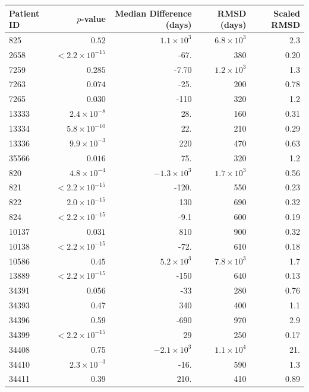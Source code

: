 \documentclass[12pt]{article}
\newcommand{\badpat}[1]{\rowcolor{badpatcol}#1}
\begin{document}
\begin{table}[!ht]
\def\arraystretch{1.3}%
\begin{center}
\begin{tabular}{lrrrr} 
Patient ID & $p$-value & Median Difference (days) & RMSD (days) & Scaled RMSD \\ 
\hline
\badpat{825 & $0.52$ & $1.1 \times 10^3$ & $6.8 \times 10^3$ & 2.3} \\
2658 & $< 2.2 \times 10^{-15}$  & -67. & 380 & 0.20 \\
\badpat{7259 & $0.285$ & -7.70 & $1.2 \times 10^{3}$ & 1.3} \\
\badpat{7263 & $0.074$ & -25. & 200 & 0.78} \\
\badpat{7265 & $0.030$ & -110 & 320 & 1.2} \\
13333 & $2.4 \times 10^{-8}$ & 28. & 160 & 0.31 \\
13334 & $5.8 \times 10^{-10}$ & 22. & 210 & 0.29 \\
13336 & $9.9 \times 10^{-3}$ & 220 & 470 & 0.63 \\
\badpat{35566 & $0.016$ & 75. & 320 & 1.2} \\
\hline
820 & $4.8 \times 10^{-4}$ & $-1.3 \times 10^{3}$ & $1.7 \times 10^{3}$ & 0.56 \\
821 & $< 2.2 \times 10^{-15}$ & -120. & 550 & 0.23 \\
822 & $2.0 \times 10^{-15}$ & 130 & 690 & 0.32 \\
824 & $< 2.2 \times 10^{-15}$ & -9.1 & 600 & 0.19 \\
\badpat{10137 & $0.031$ & 810 & 900 & 0.32} \\
10138 & $< 2.2 \times 10^{-15}$ & -72. & 610 & 0.18 \\
\badpat{10586 & $0.45$ & $5.2 \times 10^3$ & $7.8 \times 10^{3}$ & 1.7} \\
13889 & $< 2.2 \times 10^{-15}$ & -150 & 640 & 0.13 \\
\badpat{34391 & 0.056 & -33 & 280 & 0.76} \\
\badpat{34393 & 0.47 & 340 & 400 & 1.1} \\
\badpat{34396 & 0.59 & -690 & 970 & 2.9} \\
34399 & $< 2.2 \times 10^{-15}$ & 29 & 250 & 0.17 \\
\badpat{34408 & 0.75 & $-2.1 \times 10^{3}$ & $1.1 \times 10^{4}$ & 21.} \\
34410 & $2.3 \times 10^{-3}$ & -16. & 590 & 1.3 \\
\badpat{34411 & 0.39 & 210. & 410 & 0.89} \\

\end{tabular}
\end{center}
\end{table}
\end{document}
